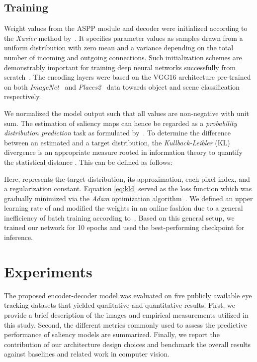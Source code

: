 \documentclass[final,1p,times,number]{elsarticle}
\begin{document}
\subsection{Training}

Weight values from the ASPP module and decoder were initialized according to the \textit{Xavier} method by~\citet{glorot2010understanding}. It specifies parameter values as samples drawn from a uniform distribution with zero mean and a variance depending on the total number of incoming and outgoing connections. Such initialization schemes are demonstrably important for training deep neural networks successfully from scratch~\cite{sutskever2013importance}. The encoding layers were based on the VGG16 architecture pre-trained on both \textit{ImageNet}~\cite{deng2009imagenet} and \textit{Places2}~\cite{zhou2017places} data towards object and scene classification respectively.

We normalized the model output such that all values are non-negative with unit sum. The estimation of saliency maps can hence be regarded as a \textit{probability distribution prediction} task as formulated by~\citet{jetley2016end}. To determine the difference between an estimated and a target distribution, the \textit{Kullback-Leibler} (KL) divergence is an appropriate measure rooted in information theory to quantify the statistical distance . This can be defined as follows:



Here,  represents the target distribution,  its approximation,  each pixel index, and  a regularization constant. Equation \eqref{eq:kld} served as the loss function which was gradually minimized via the \textit{Adam} optimization algorithm~\cite{kingma2014adam}. We defined an upper learning rate of  and modified the weights in an online fashion due to a general inefficiency of batch training according to~\citet{wilson2003general}. Based on this general setup, we trained our network for 10 epochs and used the best-performing checkpoint for inference.

\section{Experiments}

The proposed encoder-decoder model was evaluated on five publicly available eye tracking datasets that yielded qualitative and quantitative results. First, we provide a brief description of the images and empirical measurements utilized in this study. Second, the different metrics commonly used to assess the predictive performance of saliency models are summarized. Finally, we report the contribution of our architecture design choices and benchmark the overall results against baselines and related work in computer vision.
\end{document}
